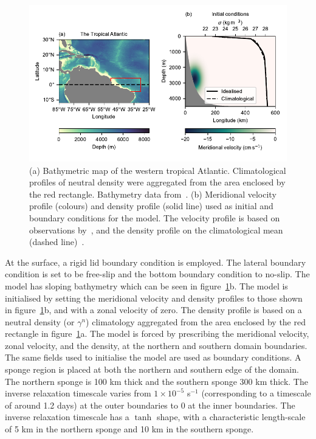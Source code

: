 \begin{figure}[ht!]
    \centering
    \includegraphics[width=\textwidth]{../figures/Figure1.pdf}
    \caption{(a) Bathymetric map of the western tropical Atlantic. Climatological profiles of neutral density were aggregated from the area enclosed by the red rectangle. Bathymetry data from~\citet{GEBCO2020}. (b) Meridional velocity profile (colours) and density profile (solid line) used as initial and boundary conditions for the model. The velocity profile is based on observations by~\citet{Schott2005}, and the density profile on the climatological mean (dashed line)~\citep{WOA2018}.}
    \label{fig:fig1}
\end{figure}

At the surface, a rigid lid boundary condition is employed. The lateral boundary condition is set to be free-slip and the bottom boundary condition to no-slip. The model has sloping bathymetry which can be seen in figure~\ref{fig:fig1}b. The model is initialised by setting the meridional velocity and density profiles to those shown in figure~\ref{fig:fig1}b, and with a zonal velocity of zero. The density profile is based on a neutral density (or $\gamma^n$) climatology aggregated from the area enclosed by the red rectangle in figure~\ref{fig:fig1}a. The model is forced by prescribing the meridional velocity, zonal velocity, and the density, at the northern and southern domain boundaries. The same fields used to initialise the model are used as boundary conditions. A sponge region is placed at both the northern and southern edge of the domain. The northern sponge is 100 km thick and the southern sponge 300 km thick. The inverse relaxation timescale varies from $1\times 10^{-5}$ s$^{-1}$ (corresponding to a timescale of around 1.2 days) at the outer boundaries to 0 at the inner boundaries. The inverse relaxation timescale has a $\tanh$ shape, with a characteristic length-scale of 5 km in the northern sponge and 10 km in the southern sponge.

